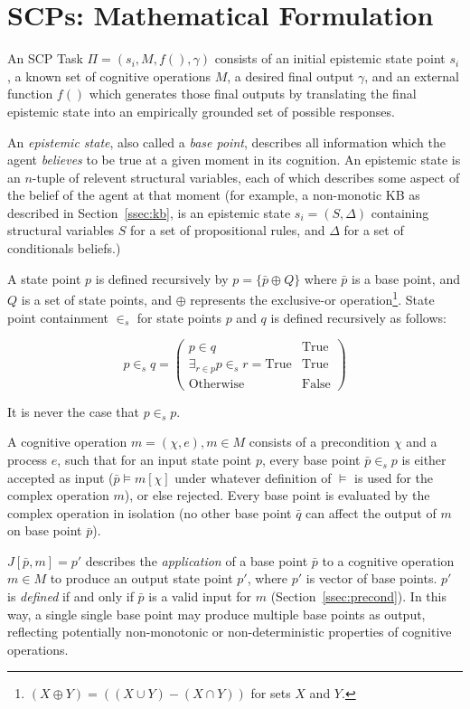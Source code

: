 \section{SCPs: Mathematical Formulation}
An SCP Task $\Pi=(s_i, M, f(), \gamma)$ consists of an initial epistemic state point $s_i$, a known set of cognitive operations $M$, a desired final output $\gamma$, and an external function $f()$ which generates those final outputs by translating the final epistemic state into an empirically grounded set of possible responses. 

An \textit{epistemic state}, also called a \textit{base point}, describes all information which the agent \textit{believes} to be true at a given moment in its cognition. An epistemic state is an $n$-tuple of relevent structural variables, each of which describes some aspect of the belief of the agent at that moment (for example, a non-monotic KB as described in Section~\ref{ssec:kb}, is an epistemic state $s_i=(S,\Delta)$ containing structural variables $S$ for a set of propositional rules, and $\Delta$ for a set of conditionals beliefs.)

A state point $p$ is defined recursively by $p=\{\bar{p} \oplus Q \}$ where $\bar{p}$ is a base point, and $Q$ is a set of state points, and $\oplus$ represents the exclusive-or operation\footnote{$(X \oplus Y) = ((X \cup Y) - (X \cap Y))$ for sets $X$ and $Y$.}. State point containment $\in_s$ for state points $p$ and $q$ is defined recursively as follows:

\[
p \in_s q = \begin{pmatrix} p \in q  & \textrm{True} \\   \exists_{r\in p}p \in_s r = \textrm{True} & \textrm{True}   \\ \textrm{Otherwise} & \textrm{False} \end{pmatrix}
\]

It is never the case that $p \in_s p$.

A cognitive operation $m = (\chi, e), m \in M$ consists of a precondition $\chi$ and a process $e$, such that for an input state point $p$, every base point $\bar{p} \in_s p$ is either accepted as input ($\bar{p} \models m[\chi]$ under whatever definition of $\models$ is used for the complex operation $m$), or else rejected. Every base point is evaluated by the complex operation in isolation (no other base point $\bar{q}$ can affect the output of $m$ on base point $\bar{p}$).

$J[\bar{p},m]=p'$ describes the \textit{application} of a base point $\bar{p}$ to a cognitive operation $m \in M$ to produce an output state point $p'$, where $p'$ is vector of base points. $p'$ is \textit{defined} if and only if $\bar{p}$ is a valid input for $m$ (Section~\ref{ssec:precond}). In this way, a single single base point may produce multiple base points as output, reflecting potentially non-monotonic or non-deterministic properties of cognitive operations. 

